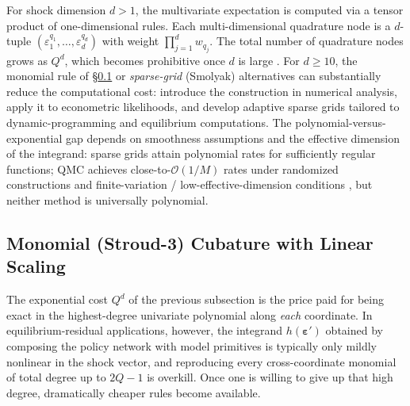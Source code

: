 \documentclass[11pt,a4paper]{report}
\begin{document}
For shock dimension $d > 1$, the multivariate expectation is computed via a tensor product of one-dimensional rules.  Each multi-dimensional quadrature node is a $d$-tuple $(\varepsilon_1^{q_1}, \ldots, \varepsilon_d^{q_d})$ with weight $\prod_{j=1}^{d} w_{q_j}$.  The total number of quadrature nodes grows as $Q^{d}$, which becomes prohibitive once $d$ is large \citep[see][Section~7.7, for a textbook treatment of product rules and their cost]{judd1998numerical}.  For $d \geq 10$, the monomial rule of \S\ref{sec:monomial_cubature} or \emph{sparse-grid} (Smolyak) alternatives can substantially reduce the computational cost: \citet{gerstner1998numerical} introduce the construction in numerical analysis, \citet{heiss2008likelihood} apply it to econometric likelihoods, and \citet{ECTA:ECTA1716} develop adaptive sparse grids tailored to dynamic-programming and equilibrium computations.  The polynomial-versus-exponential gap depends on smoothness assumptions and the effective dimension of the integrand: sparse grids attain polynomial rates for sufficiently regular functions; QMC achieves close-to-$\mathcal{O}(1/M)$ rates under randomized constructions and finite-variation / low-effective-dimension conditions \citep{sobol1967distribution, niederreiter1992random, owen1995randomly, caflisch1998monte, novak2008tractability}, but neither method is universally polynomial.

\subsection{Monomial (Stroud-3) Cubature with Linear Scaling}
\label{sec:monomial_cubature}

The exponential cost $Q^{d}$ of the previous subsection is the price paid for being exact in the highest-degree univariate polynomial along \emph{each} coordinate.  In equilibrium-residual applications, however, the integrand $h(\bm\varepsilon')$ obtained by composing the policy network with model primitives is typically only mildly nonlinear in the shock vector, and reproducing every cross-coordinate monomial of total degree up to $2Q-1$ is overkill.  Once one is willing to give up that high degree, dramatically cheaper rules become available.
\end{document}
